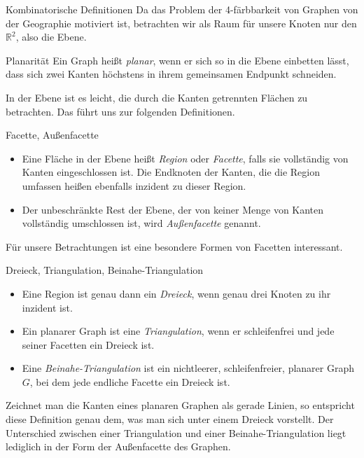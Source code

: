 \begin{section}{Kombinatorische Definitionen}
  Da das Problem der 4-färbbarkeit von Graphen von der Geographie motiviert ist, betrachten wir als Raum für unsere Knoten nur den $\mathbb{R}^2$, also die Ebene.
  
  \begin{definition}{Planarität}
   Ein Graph heißt \textit{planar}, wenn er sich so in die Ebene einbetten lässt, dass sich zwei Kanten höchstens in ihrem gemeinsamen Endpunkt schneiden.
  \end{definition}
  
  In der Ebene ist es leicht, die durch die Kanten getrennten Flächen zu betrachten. Das führt uns zur folgenden Definitionen.
  
  \begin{definition}{Facette, Außenfacette}
   \-\ 
   \begin{itemize}
   \item Eine Fläche in der Ebene heißt \textit{Region} oder \textit{Facette}, falls sie vollständig von Kanten eingeschlossen ist. Die Endknoten der Kanten, die die Region umfassen heißen ebenfalls inzident zu dieser Region. 
   \item Der unbeschränkte Rest der Ebene, der von keiner Menge von Kanten vollständig umschlossen ist, wird \textit{Außenfacette} genannt.
   \end{itemize}
  \end{definition}
  
  Für unsere Betrachtungen ist eine besondere Formen von Facetten interessant. 
  
  \begin{definition}{Dreieck, Triangulation, Beinahe-Triangulation}
   \-\ 
   \begin{itemize}
   \item Eine Region ist genau dann ein \textit{Dreieck}, wenn genau drei Knoten zu ihr inzident ist. 
   \item Ein planarer Graph ist eine \textit{Triangulation}, wenn er schleifenfrei und jede seiner Facetten ein Dreieck ist. 
   \item Eine \textit{Beinahe-Triangulation} ist ein nichtleerer, schleifenfreier, planarer Graph $G$, bei dem jede endliche Facette ein Dreieck ist. 
   \end{itemize}
  \end{definition}
  
  Zeichnet man die Kanten eines planaren Graphen als gerade Linien, so entspricht diese Definition genau dem, was man sich unter einem Dreieck vorstellt. Der Unterschied zwischen einer Triangulation und einer Beinahe-Triangulation liegt lediglich in der Form der Außenfacette des Graphen. 
  

\end{section}
